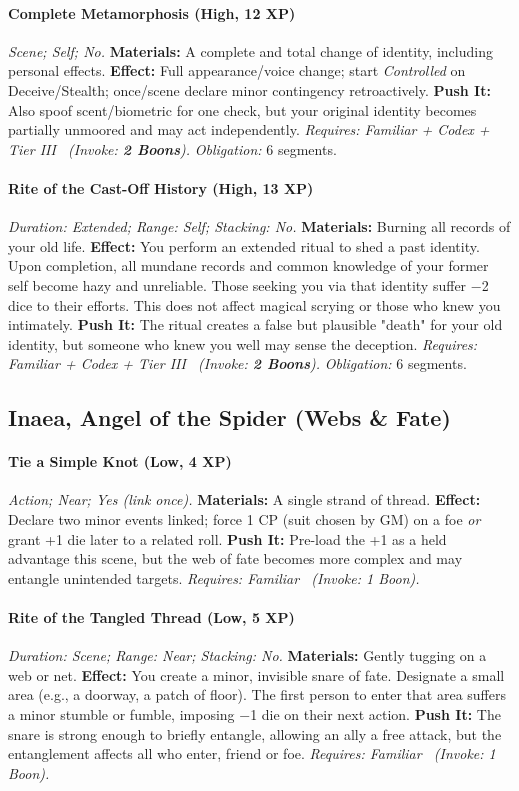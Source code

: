 \documentclass[12pt,twoside]{book}
\begin{document}
\paragraph{Complete Metamorphosis (High, 12 XP)} \emph{Scene; Self; No.}
\textbf{Materials:} A complete and total change of identity, including personal effects.
\textbf{Effect:} Full appearance/voice change; start \emph{Controlled} on Deceive/Stealth; once/scene declare minor contingency retroactively.
\textbf{Push It:} Also spoof scent/biometric for one check, but your original identity becomes partially unmoored and may act independently.
\emph{Requires: Familiar + Codex + Tier III \ (\textit{Invoke:} \textbf{2 Boons}).}
\emph{Obligation:} 6 segments.

\paragraph{Rite of the Cast-Off History (High, 13 XP)} \emph{Duration: Extended; Range: Self; Stacking: No.}
\textbf{Materials:} Burning all records of your old life.
\textbf{Effect:} You perform an extended ritual to shed a past identity. Upon completion, all mundane records and common knowledge of your former self become hazy and unreliable. Those seeking you via that identity suffer −2 dice to their efforts. This does not affect magical scrying or those who knew you intimately.
\textbf{Push It:} The ritual creates a false but plausible "death" for your old identity, but someone who knew you well may sense the deception.
\emph{Requires: Familiar + Codex + Tier III \ (\textit{Invoke:} \textbf{2 Boons}).}
\emph{Obligation:} 6 segments.

\subsection{Inaea, Angel of the Spider (Webs \& Fate)}
\paragraph{Tie a Simple Knot (Low, 4 XP)} \emph{Action; Near; Yes (link once).}
\textbf{Materials:} A single strand of thread.
\textbf{Effect:} Declare two minor events linked; force 1 CP (suit chosen by GM) on a foe \emph{or} grant +1 die later to a related roll.
\textbf{Push It:} Pre-load the +1 as a held advantage this scene, but the web of fate becomes more complex and may entangle unintended targets.
\emph{Requires: Familiar \ (\textit{Invoke:} 1 Boon).}
\paragraph{Rite of the Tangled Thread (Low, 5 XP)} \emph{Duration: Scene; Range: Near; Stacking: No.}
\textbf{Materials:} Gently tugging on a web or net.
\textbf{Effect:} You create a minor, invisible snare of fate. Designate a small area (e.g., a doorway, a patch of floor). The first person to enter that area suffers a minor stumble or fumble, imposing −1 die on their next action.
\textbf{Push It:} The snare is strong enough to briefly entangle, allowing an ally a free attack, but the entanglement affects all who enter, friend or foe.
\emph{Requires: Familiar \ (\textit{Invoke:} 1 Boon).}
\end{document}
